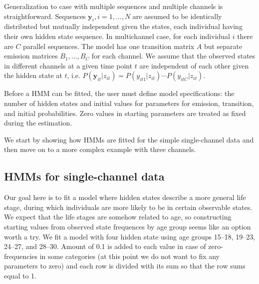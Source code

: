 \documentclass[12pt]{article}\usepackage[]{graphicx}\usepackage[]{color}
\begin{document}
Generalization to case with multiple sequences and multiple channels is straightforward. Sequences $\textbf{y}_i, i=1,\ldots,N$ are assumed to be identically distributed but mutually independent given the states, each individual having their own hidden state sequence. In multichannel case, for each individual $i$ there are $C$ parallel sequences. The model has one transition matrix $A$ but separate emission matrices $B_1,\ldots,B_C$ for each channel. We assume that the observed states in different channels at a given time point $t$ are independent of each other given the hidden state at $t$, i.e. $P(\textbf{y}_{it}|z_{it})=P(y_{it1}|z_{it})\cdots P(y_{itC}|z_{it})$.


Before a HMM can be fitted, the user must define model specifications: the number of hidden states and initial values for parameters for emission, transition, and initial probabilities. Zero values in starting parameters are treated as fixed during the estimation.

We start by showing how HMMs are fitted for the simple single-channel data and then move on to a more complex example with three channels.

\subsection{HMMs for single-channel data}

Our goal here is to fit a model where hidden states describe a more general life stage, during which individuals are more likely to be in certain observable states. We expect that the life stages are somehow related to age, so constructing starting values from observed state frequences by age group seems like an option worth a try. We fit a model with four hidden state using age groups 15--18, 19--23, 24--27, and 28--30. Amount of 0.1 is added to each value in case of zero-frequencies in some categories (at this point we do not want to fix any parameters to zero) and each row is divided with its sum so that the row sums equal to 1.
\end{document}
